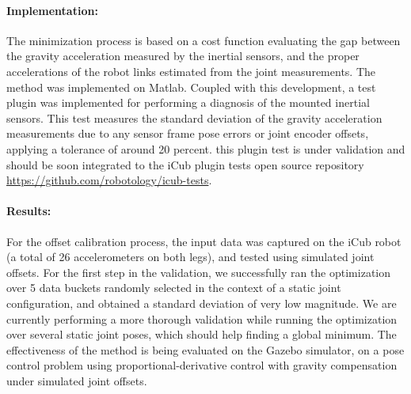 \paragraph*{Implementation:}
The minimization process is based on a cost function evaluating the gap between the gravity acceleration
measured by the inertial sensors, and the proper accelerations of the robot links estimated from the joint
measurements. The method was implemented on Matlab. Coupled with this development, a test plugin was 
implemented for performing a diagnosis of the mounted inertial sensors. This test measures the standard deviation
of the gravity acceleration measurements due to any sensor frame pose errors or joint encoder offsets, applying a tolerance 
of around 20 percent. this plugin test is under validation and should be soon integrated to the iCub plugin tests open source 
repository \url{https://github.com/robotology/icub-tests}.

\paragraph*{Results:}
For the offset calibration process, the input data was captured on the iCub robot (a total of 26 accelerometers on both legs), and
tested using simulated joint offsets. For the first step in the validation, we successfully ran the optimization over 5 data buckets randomly selected 
in the context of a static joint configuration, and obtained a standard deviation of very low magnitude. We are currently performing a 
more thorough validation while running the optimization over several static joint poses, which should help finding a global minimum.
The effectiveness of the method is being evaluated on the Gazebo simulator, on a pose control problem using proportional-derivative control with 
gravity compensation under simulated joint offsets.

